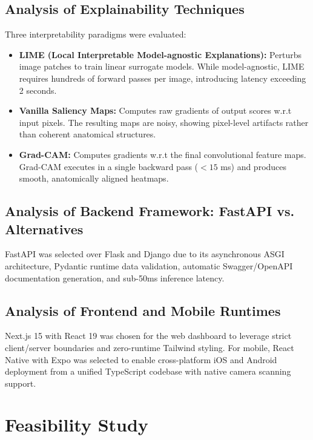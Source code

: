 \documentclass[12pt,a4paper]{report}
\begin{document}
\section{Analysis of Explainability Techniques}
Three interpretability paradigms were evaluated:
\begin{itemize}
    \item \textbf{LIME (Local Interpretable Model-agnostic Explanations):} Perturbs image patches to train linear surrogate models. While model-agnostic, LIME requires hundreds of forward passes per image, introducing latency exceeding 2 seconds.
    \item \textbf{Vanilla Saliency Maps:} Computes raw gradients of output scores w.r.t input pixels. The resulting maps are noisy, showing pixel-level artifacts rather than coherent anatomical structures.
    \item \textbf{Grad-CAM:} Computes gradients w.r.t the final convolutional feature maps. Grad-CAM executes in a single backward pass ($<15$ ms) and produces smooth, anatomically aligned heatmaps.
\end{itemize}

\section{Analysis of Backend Framework: FastAPI vs. Alternatives}
FastAPI was selected over Flask and Django due to its asynchronous ASGI architecture, Pydantic runtime data validation, automatic Swagger/OpenAPI documentation generation, and sub-50ms inference latency.

\section{Analysis of Frontend and Mobile Runtimes}
Next.js 15 with React 19 was chosen for the web dashboard to leverage strict client/server boundaries and zero-runtime Tailwind styling. For mobile, React Native with Expo was selected to enable cross-platform iOS and Android deployment from a unified TypeScript codebase with native camera scanning support.


\chapter{Feasibility Study}
\end{document}
